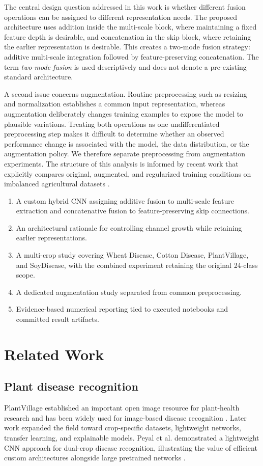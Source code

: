 \documentclass[a4paper,fleqn]{cas-dc}
\begin{document}
The central design question addressed in this work is whether different fusion operations can be assigned to different representation needs. The proposed architecture uses addition inside the multi-scale block, where maintaining a fixed feature depth is desirable, and concatenation in the skip block, where retaining the earlier representation is desirable. This creates a two-mode fusion strategy: additive multi-scale integration followed by feature-preserving concatenation. The term \emph{two-mode fusion} is used descriptively and does not denote a pre-existing standard architecture.

A second issue concerns augmentation. Routine preprocessing such as resizing and normalization establishes a common input representation, whereas augmentation deliberately changes training examples to expose the model to plausible variations. Treating both operations as one undifferentiated preprocessing step makes it difficult to determine whether an observed performance change is associated with the model, the data distribution, or the augmentation policy. We therefore separate preprocessing from augmentation experiments. The structure of this analysis is informed by recent work that explicitly compares original, augmented, and regularized training conditions on imbalanced agricultural datasets \citep{mhalap2025}.

\begin{enumerate}[leftmargin=*]
\item A custom hybrid CNN assigning additive fusion to multi-scale feature extraction and concatenative fusion to feature-preserving skip connections.
\item An architectural rationale for controlling channel growth while retaining earlier representations.
\item A multi-crop study covering Wheat Disease, Cotton Disease, PlantVillage, and SoyDisease, with the combined experiment retaining the original 24-class scope.
\item A dedicated augmentation study separated from common preprocessing.
\item Evidence-based numerical reporting tied to executed notebooks and committed result artifacts.
\end{enumerate}

\section{Related Work}
\subsection{Plant disease recognition}
PlantVillage established an important open image resource for plant-health research and has been widely used for image-based disease recognition \citep{hughes2015,mohanty2016}. Later work expanded the field toward crop-specific datasets, lightweight networks, transfer learning, and explainable models. Peyal et al. demonstrated a lightweight CNN approach for dual-crop disease recognition, illustrating the value of efficient custom architectures alongside large pretrained networks \citep{peyal2023}.
\end{document}

